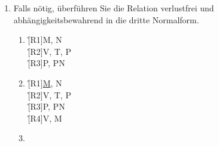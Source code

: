 \documentclass{lehramt-informatik-aufgabe}
\begin{document}
\begin{enumerate}
%

\item Falls nötig, überführen Sie die Relation verlustfrei und
abhängigkeitsbewahrend in die dritte Normalform.

\begin{liAntwort}
\begin{enumerate}
\item {}

\r[R1]{M, N} \\
\r[R2]{V, T, P} \\
\r[R3]{P, PN}

\item {}

\r[R1]{\underline{M}, N} \\
\r[R2]{V, T, P} \\
\r[R3]{P, PN} \\
\r[R4]{V, M}

\item {}

\liNichtsZuTun

\end{enumerate}
\end{liAntwort}
\end{enumerate}
\end{document}

